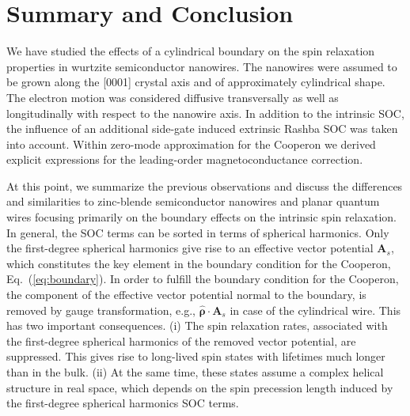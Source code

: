 \documentclass[superscriptaddress,noshowpacs,noshowkeys, twocolumn, floatfix,aps, prb,reprint]{revtex4-1}
\begin{document}
\section{Summary and Conclusion}

We have studied the effects of a cylindrical boundary on the spin relaxation properties in wurtzite semiconductor nanowires.
The nanowires were assumed to be grown along the [0001] crystal axis and of approximately cylindrical shape.
The electron motion was considered diffusive transversally as well as longitudinally with respect to the nanowire axis.
In addition to the intrinsic SOC, the influence of an additional side-gate induced extrinsic Rashba SOC was taken into account.
Within zero-mode approximation for the Cooperon we derived explicit expressions for the leading-order magnetoconductance correction.


At this point, we summarize the previous observations and discuss the differences and similarities to zinc-blende semiconductor nanowires and planar quantum wires focusing primarily on the boundary effects on the intrinsic spin relaxation.\cite{Malshukov2000,Schwab2006,Kettemann2007a,Wenk2010,Wenk2011,Kammermeier2017} 
%
In general, the SOC terms can be sorted in terms of spherical harmonics.
Only the first-degree spherical harmonics give rise to an effective vector potential $\mathbf{A}_s$, which constitutes the key element in the boundary condition for the Cooperon, Eq.~(\ref{eq:boundary}).
In order to fulfill the boundary condition for the Cooperon, the component of the effective vector potential normal to the boundary, is removed by gauge transformation, e.g., $\boldsymbol{\hat{\rho}}\cdot\mathbf{A}_s$ in case of the cylindrical wire. %
This has two important consequences. 
(i) 
The spin relaxation rates, associated with the first-degree spherical harmonics of the removed vector potential, are suppressed. 
This gives rise to long-lived spin states with lifetimes much longer than in the bulk.
(ii) At the same time, these states assume a complex helical structure in real space, which depends on the spin precession length induced by the first-degree spherical harmonics SOC terms.
\end{document}
